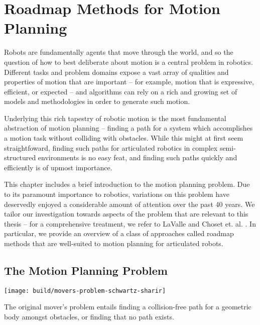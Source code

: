 \chapter{Roadmap Methods for Motion Planning}
\label{chap:roadmaps}

Robots are fundamentally agents that move through the world,
and so the question of how to best deliberate about motion
is a central problem in robotics.
Different tasks and problem domains expose a vast array of
qualities and properties of motion that are important
-- for example, motion that is expressive, efficient, or expected
-- and algorithms can rely on a rich and growing set
of models and methodologies in order to generate such motion.

Underlying this rich tapestry of robotic motion
is the most fundamental abstraction of motion planning --
finding a path for a system which accomplishes a motion task
without colliding with obstacles.
While this might at first seem straightfoward,
finding such paths for articulated robotics in
complex semi-structured environments
is no easy feat,
and finding such paths quickly and efficiently
is of upmost importance.

This chapter includes a brief introduction to
the motion planning problem.
Due to its paramount importance to robotics,
variations on this problem have deservedly
enjoyed a considerable amount of attention over the past 40 years.
We tailor our investigation towards aspects of the problem
that are relevant to this thesis
-- for a comprehensive treatment,
we refer to LaValle \citep{lavalle2006planningbook}
and Choset et. al. \citep{choset2005robotmotion}.
In particular,
we provide an overview of a class of approaches called roadmap methods
that are well-suited to motion planning for articulated robots.

\section{The Motion Planning Problem}

\begin{marginfigure}
   \centering
   \texttt{[image: build/movers-problem-schwartz-sharir]} %
   \caption{The original mover's problem
      \citep{schwartzsharir1983pianomovers1}
      entails finding a collision-free path for a geometric body
      amongst obstacles,
      or finding that no path exists.}
   \label{fig:roadmaps:movers}
\end{marginfigure}


